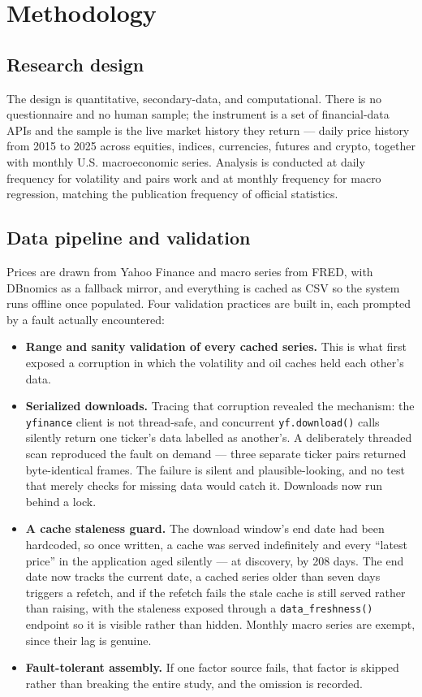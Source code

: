 \documentclass[11pt,a4paper]{article}
\begin{document}
\section{Methodology}

\subsection{Research design}

The design is quantitative, secondary-data, and computational. There is no questionnaire
and no human sample; the instrument is a set of financial-data APIs and the sample is the
live market history they return --- daily price history from 2015 to 2025 across equities,
indices, currencies, futures and crypto, together with monthly U.S. macroeconomic series.
Analysis is conducted at daily frequency for volatility and pairs work and at monthly
frequency for macro regression, matching the publication frequency of official statistics.

\subsection{Data pipeline and validation}

Prices are drawn from Yahoo Finance and macro series from FRED, with DBnomics as a
fallback mirror, and everything is cached as CSV so the system runs offline once populated.
Four validation practices are built in, each prompted by a fault actually encountered:

\begin{itemize}
\item \textbf{Range and sanity validation of every cached series.} This is what first
exposed a corruption in which the volatility and oil caches held each other's data.
\item \textbf{Serialized downloads.} Tracing that corruption revealed the mechanism: the
\texttt{yfinance} client is not thread-safe, and concurrent \texttt{yf.download()} calls
silently return one ticker's data labelled as another's. A deliberately threaded scan
reproduced the fault on demand --- three separate ticker pairs returned byte-identical
frames. The failure is silent and plausible-looking, and no test that merely checks for
missing data would catch it. Downloads now run behind a lock.
\item \textbf{A cache staleness guard.} The download window's end date had been hardcoded,
so once written, a cache was served indefinitely and every ``latest price'' in the
application aged silently --- at discovery, by 208 days. The end date now tracks the
current date, a cached series older than seven days triggers a refetch, and if the refetch
fails the stale cache is still served rather than raising, with the staleness exposed
through a \texttt{data\_freshness()} endpoint so it is visible rather than hidden. Monthly
macro series are exempt, since their lag is genuine.
\item \textbf{Fault-tolerant assembly.} If one factor source fails, that factor is skipped
rather than breaking the entire study, and the omission is recorded.
\end{itemize}
\end{document}
